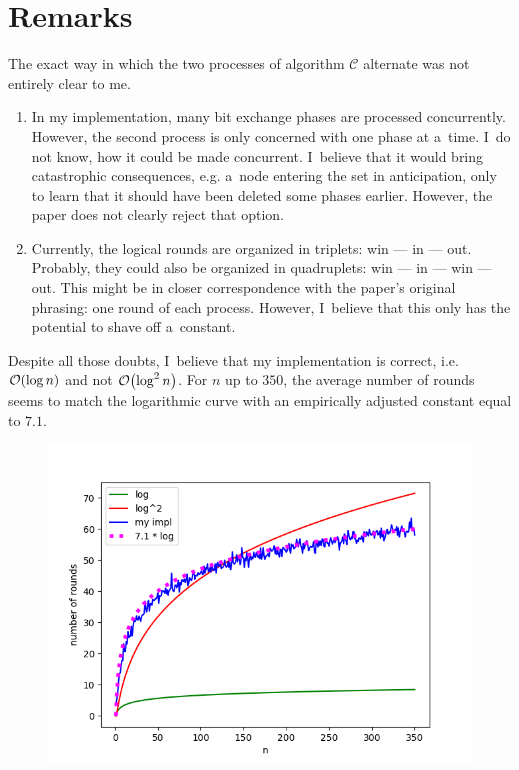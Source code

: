 \documentclass{article}
\DeclarePairedDelimiter{\parenthesesdelimiter}{(}{)}
\def\pars{\parenthesesdelimiter*}
\newcommand{\bigO}{\mathcal{O}}
\begin{document}
\section{Remarks}
The exact way in which the two processes of algorithm \(\mathcal{C}\) alternate was not entirely clear to me.
\begin{enumerate}
    \item In my implementation, many bit exchange phases are processed concurrently. However, the second process is only concerned with one phase at a~time. I~do not know, how it could be made concurrent. I~believe that it would bring catastrophic consequences, e.g. a~node entering the set in anticipation, only to learn that it should have been deleted some phases earlier. However, the paper does not clearly reject that option.
    \item Currently, the logical rounds are organized in triplets: win --- in --- out. Probably, they could also be organized in quadruplets: win --- in --- win --- out. This might be in closer correspondence with the paper's original phrasing: one round of each process. However, I~believe that this only has the potential to shave off a~constant.
\end{enumerate}
Despite all those doubts, I~believe that my implementation is correct, i.e. \(\bigO\pars{\log n}\) and not \(\bigO\pars{\log^2n}\). For \(n\) up to \(350\), the average number of rounds seems to match the logarithmic curve with an empirically adjusted constant equal to \(7.1\).
\begin{figure}[H]
    \centering
    \includegraphics{comparison.png}
\end{figure}



\end{document}
